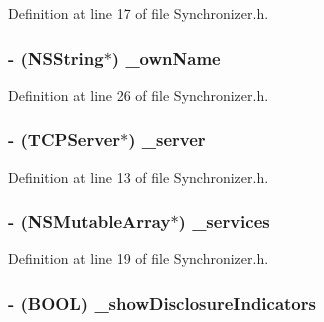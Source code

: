 Definition at line 17 of file Synchronizer.h.

\hypertarget{interface_synchronizer_ad9ec4e9aff66fd4f5d0ce3236d85f0e3}{
\subsubsection[{\_\-ownName}]{\setlength{\rightskip}{0pt plus 5cm}-\/ (NSString$\ast$) {\bf \_\-ownName}}}
\label{interface_synchronizer_ad9ec4e9aff66fd4f5d0ce3236d85f0e3}


Definition at line 26 of file Synchronizer.h.

\hypertarget{interface_synchronizer_aacb0d561b81284ff5f32bb7f504d844c}{
\subsubsection[{\_\-server}]{\setlength{\rightskip}{0pt plus 5cm}-\/ ({\bf TCPServer}$\ast$) {\bf \_\-server}}}
\label{interface_synchronizer_aacb0d561b81284ff5f32bb7f504d844c}


Definition at line 13 of file Synchronizer.h.

\hypertarget{interface_synchronizer_a2a30fdc9d63f496a755a2c70917319e6}{
\subsubsection[{\_\-services}]{\setlength{\rightskip}{0pt plus 5cm}-\/ (NSMutableArray$\ast$) {\bf \_\-services}}}
\label{interface_synchronizer_a2a30fdc9d63f496a755a2c70917319e6}


Definition at line 19 of file Synchronizer.h.

\hypertarget{interface_synchronizer_a2336bd720576551dba8f8d780a7a2532}{
\subsubsection[{\_\-showDisclosureIndicators}]{\setlength{\rightskip}{0pt plus 5cm}-\/ (BOOL) {\bf \_\-showDisclosureIndicators}}}
\label{interface_synchronizer_a2336bd720576551dba8f8d780a7a2532}


